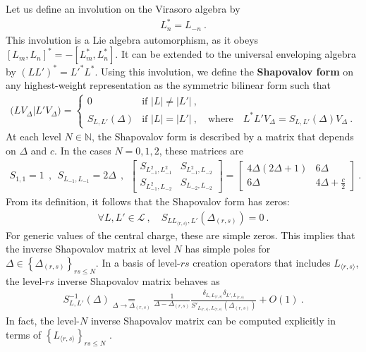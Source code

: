 \documentclass[12pt, a4paper]{article}
\newcommand{\myindex}[1]{\textbf{\boldmath #1}}
\theoremstyle{break}
\begin{document}
Let us define an involution on the Virasoro algebra by 
\begin{align}
 L^*_n = L_{-n} \ . 
\end{align}
This involution is a Lie algebra automorphism, as it obeys $[L_m,L_n]^* = -[L_m^*,L_n^*]$. It can be extended to the universal enveloping algebra by $\left(LL'\right)^* = L'^*L^*$. Using this involution, we define the \myindex{Shapovalov form} on any highest-weight representation as the symmetric bilinear form such that 
\begin{align}
 \big(LV_\Delta\big| L'V_\Delta\big) = \left\{\begin{array}{ll} 0 & \text{if } |L|\neq |L'|\ , 
                                                \\
                                              S_{L,L'}(\Delta) & \text{if } |L|=|L'|\ , \quad \text{where} \quad L^*L'V_\Delta = S_{L,L'}(\Delta) V_\Delta\ .  
                                             \end{array}\right.
\label{shap}
\end{align}
At each level $N\in\mathbb{N}$, the Shapovalov form is described by a matrix that depends on $\Delta$ and $c$. In the cases $N=0,1,2$, these matrices are 
\begin{align}
 S_{1,1} = 1 \ \  , \ \   S_{L_{-1},L_{-1}} = 2\Delta \ \  , \ \  \begin{bmatrix} S_{L_{-1}^2,L_{-1}^2} & S_{L_{-1}^2,L_{-2}} \\ S_{L_{-1}^2,L_{-2}} & S_{L_{-2},L_{-2}}\end{bmatrix} = 
 \begin{bmatrix} 4\Delta(2\Delta+1) & 6\Delta \\ 6\Delta & 4\Delta+\frac{c}{2}\end{bmatrix}\ .
 \label{sh012}
\end{align}
From its definition, it follows that the Shapovalov form has zeros: 
\begin{align}
 \forall L, L'\in \mathcal{L}\ , \quad S_{LL_{\langle r,s\rangle},L'}(\Delta_{(r,s)})=0 \ . 
\end{align}
For generic values of the central charge, these are simple zeros. This implies that the inverse Shapovalov matrix at level $N$ has simple poles for $\Delta\in \left\{\Delta_{(r,s)}\right\}_{rs\leq N}$. In a basis of level-$rs$ creation operators that includes $L_{\langle r,s\rangle}$, the level-$rs$ inverse Shapovalov matrix behaves as 
\begin{align}
 S^{-1}_{L,L'}(\Delta) \underset{\Delta\to \Delta_{(r,s)}} = \frac{1}{\Delta-\Delta_{(r,s)}} \frac{\delta_{L,L_{\langle r,s\rangle}}\delta_{L',L_{\langle r,s\rangle}}}{S'_{L_{\langle r,s\rangle},L_{\langle r,s\rangle}}(\Delta_{(r,s)})}  + O(1) \ . 
 \label{smo}
\end{align}
In fact, the level-$N$ inverse Shapovalov matrix can be computed explicitly in terms of $\left\{L_{\langle r,s\rangle}\right\}_{rs\leq N}$ \cite{fqs24}.
\end{document}
